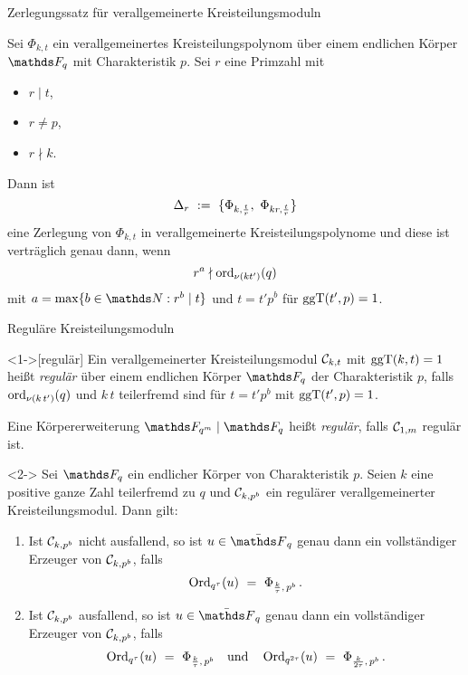 \documentclass{vorlage}
\begin{document}
\begin{frame}{Zerlegungssatz für verallgemeinerte Kreisteilungsmoduln}
  \begin{satz}[(Hachenberger 1997)]
    Sei $\Phi_{k,t}$ ein verallgemeinertes Kreisteilungspolynom über einem
    endlichen Körper $\F_q$ mit Charakteristik $p$. Sei $r$ eine Primzahl
    mit

    \begin{itemize}
      \item $r \mid t$,
      \item $r \neq p$,
      \item $r \nmid k$.
    \end{itemize}

    Dann ist 
    \[ \Delta_r \ :=\  \{ \Phi_{k,\frac{t}{r}},\ \Phi_{kr, \frac{t}{r}}\}\]
    eine Zerlegung von $\Phi_{k,t}$ in verallgemeinerte Kreisteilungspolynome und
    diese ist verträglich genau dann, wenn
    \[ r^a \nmid \operatorname{ord}_{\nu(kt')}(q) \]
    mit $a = \max\{ b\in \N: r^b \mid t\}$ und 
    $t=t'p^b$ für $\operatorname{ggT}(t',p)=1$.
  \end{satz}
\end{frame}


\begin{frame}{Reguläre Kreisteilungsmoduln}
  \begin{definition}<1->[regulär]
    Ein verallgemeinerter Kreisteilungsmodul $\mathcal{C}_{k,t}$ 
    mit $\operatorname{ggT}(k,t)=1$ heißt \emph{regulär} über 
    einem endlichen Körper $\F_q$ der Charakteristik $p$,
    falls $\operatorname{ord}_{\nu(k\,t')}(q)$ und $k\,t$ teilerfremd sind für
    $t=t'p^b$ mit $\operatorname{ggT}(t',p)=1$.

    Eine Körpererweiterung $\F_{q^m} \mid \F_q$ heißt \emph{regulär}, falls
    $\mathcal{C}_{1,m}$ regulär ist.
  \end{definition}
  \begin{satz}[(Hachenberger 1997)]<2->
    Sei $\F_q$ ein endlicher Körper von Charakteristik $p$. 
    Seien $k$ eine positive ganze Zahl teilerfremd zu $q$ und 
    $\mathcal{C}_{k,p^b}$ ein regulärer verallgemeinerter Kreisteilungsmodul. Dann gilt:
    \begin{enumerate}
      \item{}
        Ist $\mathcal{C}_{k,p^b}$ nicht ausfallend, so ist $u \in \bar \F_q$ genau dann
        ein vollständiger Erzeuger von $\mathcal{C}_{k,p^b}$, falls
        \[ \operatorname{Ord}_{q^\tau}(u) \ =\  \Phi_{\frac k \tau,\, p^b} \,.\]
      \item {}
        Ist $\mathcal{C}_{k,p^b}$ ausfallend, so ist $u\in \bar \F_q$ genau dann
        ein vollständiger Erzeuger von $\mathcal{C}_{k,p^b}$, falls
        \[ \operatorname{Ord}_{q^\tau}(u) \ =\  \Phi_{\frac k \tau,\, p^b} \quad
          \text{und}\quad 
          \operatorname{Ord}_{q^{2\tau}}(u) \ =\  \Phi_{\frac{k}{2\tau},\, p^b}\,.\]
    \end{enumerate}
  \end{satz}
\end{frame}
\end{document}
